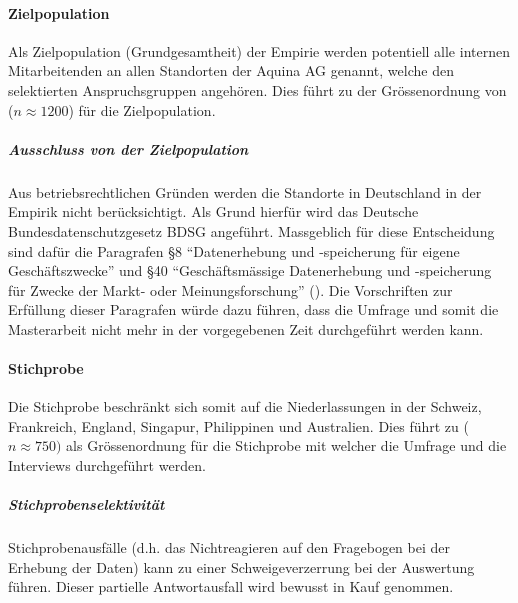 \documentclass[../../main.tex]{subfiles}
\begin{document}
\paragraph*{Zielpopulation}\mbox{}

\begin{sloppypar}
Als Zielpopulation (Grundgesamtheit) der Empirie werden potentiell alle internen Mitarbeitenden an allen Standorten der Aquina AG genannt, welche den selektierten Anspruchsgruppen angehören. Dies führt zu der Grössenordnung von ($n \approx 1200$) für die Zielpopulation.
\end{sloppypar}

\subparagraph*{Ausschluss von der Zielpopulation}\mbox{}

\begin{sloppypar}
Aus betriebsrechtlichen Gründen werden die Standorte in Deutschland in der Empirik nicht berücksichtigt. Als Grund hierfür wird das  Deutsche Bundesdatenschutzgesetz BDSG angeführt. Massgeblich für diese Entscheidung sind dafür die Paragrafen \S8 "`Datenerhebung und -speicherung für eigene Geschäftszwecke"' und \S40 "`Geschäftsmässige Datenerhebung und -speicherung für Zwecke der Markt- oder Meinungsforschung"' (\cite{bmjv_bundesdatenschutzgesetz_1990}). Die Vorschriften zur Erfüllung dieser Paragrafen würde dazu führen, dass die Umfrage und somit die Masterarbeit nicht mehr in der vorgegebenen Zeit durchgeführt werden kann.
\end{sloppypar}

\paragraph*{Stichprobe}\mbox{}
\begin{sloppypar}
Die Stichprobe beschränkt sich somit auf die Niederlassungen in der Schweiz, Frankreich, England, Singapur, Philippinen und Australien. Dies führt zu ($n \approx 750)$ als Grössenordnung für die Stichprobe mit welcher die Umfrage und die Interviews durchgeführt werden.
\end{sloppypar}

\subparagraph*{Stichprobenselektivität}\mbox{}

\begin{sloppypar}
Stichprobenausfälle (d.h. das Nichtreagieren auf den Fragebogen bei der Erhebung der Daten) kann zu einer Schweigeverzerrung bei der Auswertung führen. Dieser partielle Antwortausfall wird bewusst in Kauf genommen. 
\end{sloppypar}
\end{document}
